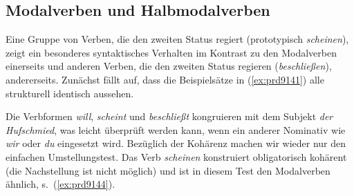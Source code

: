 \begin{exe}
\end{exe}


\subsection{Modalverben und Halbmodalverben}

\label{sec:halbmodale}

Eine Gruppe von Verben, die den zweiten Status regiert (prototypisch \textit{scheinen}), zeigt ein besonderes syntaktisches Verhalten im Kontrast zu den Modalverben einerseits und anderen Verben, die den zweiten Status regieren (\zB \textit{beschließen}), andererseits.
Zunächst fällt auf, dass die Beispielsätze in (\ref{ex:prd9141}) alle strukturell identisch aussehen.

\begin{exe}
  \ex\label{ex:prd9141} 
  \begin{xlist}
  \end{xlist}
\end{exe}


Die Verbformen \textit{will}, \textit{scheint} und \textit{beschließt} kongruieren mit dem Subjekt \textit{der Hufschmied}, was leicht überprüft werden kann, wenn ein anderer Nominativ wie \textit{wir} oder \textit{du} eingesetzt wird.
Bezüglich der Kohärenz machen wir wieder nur den einfachen Umstellungstest.
Das Verb \textit{scheinen} konstruiert obligatorisch kohärent (die Nachstellung ist nicht möglich) und ist in diesem Test den Modalverben ähnlich, s.\ (\ref{ex:prd9144}).

\begin{exe}
  \ex\label{ex:prd9144} 
  \begin{xlist}
  \end{xlist}
\end{exe}

